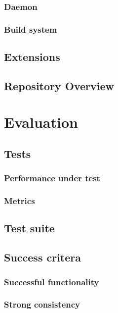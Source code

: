 \documentclass[12pt,a4paper,twoside,openright]{report}
\begin{document}
\subsection{Daemon}

\subsection{Build system}

\section{Extensions}

\section{Repository Overview}

\chapter{Evaluation}

\section{Tests}

\subsection{Performance under test}

\subsection{Metrics}

\section{Test suite}

\section{Success critera}

\subsection{Successful functionality}

\subsection{Strong consistency}
\end{document}
